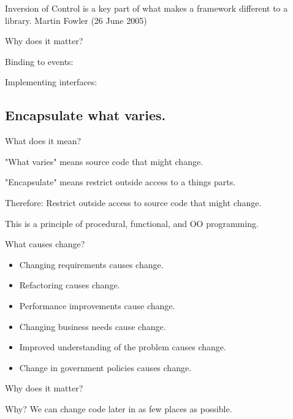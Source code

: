 \documentclass{beamer}
\begin{document}
\begin{frame}
Inversion of Control is a key part of what makes a framework different to a library.
Martin Fowler (26 June 2005)
\end{frame}

\begin{frame}{Why does it matter?}
\end{frame}

\begin{frame}{Binding to events:}
    
\end{frame}

\begin{frame}{Implementing interfaces:}
    
\end{frame}

\subsection{Encapsulate what varies.}

\begin{frame}{What does it mean?}
    \par "What varies" means source code that might change.
    \par "Encapsulate" means restrict outside access to a things parts.
    \par Therefore: Restrict outside access to source code that might change.
    \par This is a principle of procedural, functional, and OO programming.
\end{frame}

\begin{frame}{What causes change?}
    \begin{itemize}
        \item Changing requirements causes change.
        \item Refactoring causes change. 
        \item Performance improvements cause change. 
        \item Changing business needs cause change. 
        \item Improved understanding of the problem causes change. 
        \item Change in government policies causes change.
    \end{itemize}
\end{frame}

\begin{frame}{Why does it matter?}
    \par Why? We can change code later in as few places as possible.
\end{frame}
\end{document}
